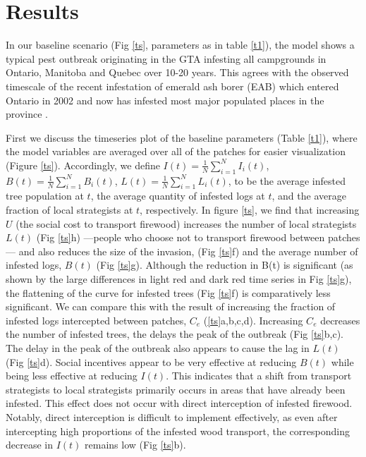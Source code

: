 \section{Results}

In our baseline scenario (Fig \ref{ts}, parameters as in table \ref{t1}), the model shows a typical pest outbreak originating in the GTA infesting all campgrounds in Ontario, Manitoba and Quebec over 10-20 years. This agrees with the observed timescale of the recent infestation of emerald ash borer (EAB) which entered Ontario in 2002 and now has infested most major populated places in the province \cite{cfia_2019}.



First we discuss the timeseries plot of the baseline parameters (Table \ref{t1}), where the model variables are averaged over all of the patches for easier visualization (Figure \ref{ts}). Accordingly, we define $I(t) = \frac{1}{N} \sum_{i = 1}^N I_i(t)$, $B(t) = \frac{1}{N} \sum_{i = 1}^N B_i(t)$, $L(t) = \frac{1}{N} \sum_{i = 1}^N L_i(t)$, to be the average infested tree population at $t$, the average quantity of infested logs at $t$, and the average fraction of local strategists at $t$, respectively. In figure \ref{ts}, we find that increasing $U$ (the social cost to transport firewood) increases the number of local strategists $L(t)$ (Fig \ref{ts}h) —people who choose not to transport firewood between patches— and also reduces the size of the invasion, (Fig \ref{ts}f) and the average number of infested logs, $B(t)$ (Fig \ref{ts}g). Although the reduction in B(t) is significant (as shown by the large differences in light red and dark red time series in Fig \ref{ts}g), the flattening of the curve for infested trees (Fig \ref{ts}f) is comparatively less significant. We can compare this with the result of increasing the fraction of infested logs intercepted between patches, $C_e$ (\ref{ts}a,b,c,d). Increasing $C_e$ decreases the number of infested trees, the delays the peak of the outbreak (Fig \ref{ts}b,c). The delay in the peak of the outbreak also appears to cause the lag in $L(t)$ (Fig \ref{ts}d). Social incentives appear to be very effective at reducing $B(t)$ while being less effective at reducing $I(t)$. This indicates that a shift from transport strategists to local strategists primarily occurs in areas that have already been infested. This effect does not occur with direct interception of infested firewood. Notably, direct interception is difficult to implement effectively, as even after intercepting high proportions of the infested wood transport, the corresponding decrease in $I(t)$ remains low (Fig \ref{ts}b). 


